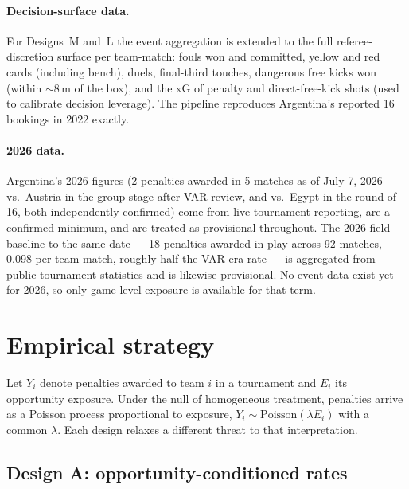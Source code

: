 \documentclass[11pt,a4paper]{article}
\begin{document}
\paragraph{Decision-surface data.} For Designs~M and~L the event aggregation is
extended to the full referee-discretion surface per team-match: fouls won and
committed, yellow and red cards (including bench), duels, final-third touches,
dangerous free kicks won (within $\sim$8\,m of the box), and the xG of penalty and
direct-free-kick shots (used to calibrate decision leverage). The pipeline reproduces
Argentina's reported 16 bookings in 2022 exactly.

\paragraph{2026 data.} Argentina's 2026 figures (2 penalties awarded in 5 matches as
of July 7, 2026 --- vs.\ Austria in the group stage after VAR review, and vs.\ Egypt
in the round of 16, both independently confirmed) come from live tournament
reporting, are a confirmed minimum, and are treated as provisional throughout. The
2026 field baseline to the same date --- 18 penalties awarded in play across 92
matches, 0.098 per team-match, roughly half the VAR-era rate --- is aggregated from
public tournament statistics and is likewise provisional. No event data exist yet
for 2026, so only game-level exposure is available for that term.

\section{Empirical strategy}
\label{sec:strategy}

Let $Y_i$ denote penalties awarded to team $i$ in a tournament and $E_i$ its
opportunity exposure. Under the null of homogeneous treatment, penalties arrive as a
Poisson process proportional to exposure, $Y_i \sim
\text{Poisson}(\lambda E_i)$ with a common $\lambda$. Each design relaxes a
different threat to that interpretation.

\subsection{Design A: opportunity-conditioned rates}
\label{sec:designA}
\end{document}
